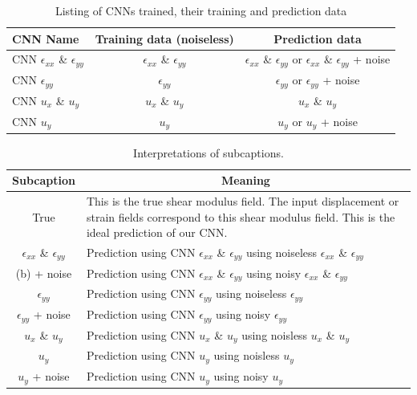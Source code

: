 \documentclass[12pt]{article}
\begin{document}
\begin{table}
  \centering
  \begin{tabular}{|l|c|c|}
    \hline
    CNN Name & Training data (noiseless) & Prediction data \\
    \hline
    CNN $\epsilon_{xx}$ \& $\epsilon_{yy}$ & $\epsilon_{xx}$ \& $\epsilon_{yy}$ & $\epsilon_{xx}$ \& $\epsilon_{yy}$ or $\epsilon_{xx}$ \& $\epsilon_{yy}$ + noise\\
    \hline
    CNN $\epsilon_{yy}$ & $\epsilon_{yy}$ & $\epsilon_{yy}$ or $\epsilon_{yy}$ + noise\\
    \hline
    CNN $u_x$ \& $u_y$ & $u_x$ \& $u_y$ & $u_x$ \& $u_y$\\
    \hline
    CNN $u_y$ & $u_y$ & $u_y$ or $u_y$ + noise\\
    \hline
  \end{tabular}
  \caption{\label{tab:cnnone:io} Listing of CNNs trained, their training and prediction data}
\end{table}
%
\begin{table}
  \centering
   \begin{tabular}{cp{8cm}}
    \hline
    \multicolumn{1}{|c|}{Subcaption} & \multicolumn{1}{c|}{Meaning}\\
    \hline
    \multicolumn{1}{|c|}{True} & \multicolumn{1}{p{8cm}|}{This is the true shear modulus field. The input displacement or strain fields correspond to this shear modulus field. This is the ideal prediction of our CNN.}\\
    \hline
    \multicolumn{1}{|c|}{$\epsilon_{xx}$ \& $\epsilon_{yy}$} & \multicolumn{1}{p{8cm}|}{Prediction using CNN $\epsilon_{xx}$ \& $\epsilon_{yy}$ using noiseless $\epsilon_{xx}$ \& $\epsilon_{yy}$}\\
    \hline
    \multicolumn{1}{|c|}{(b) + noise} & \multicolumn{1}{p{8cm}|}{Prediction using CNN $\epsilon_{xx}$ \& $\epsilon_{yy}$ using noisy $\epsilon_{xx}$ \& $\epsilon_{yy}$}\\
    \hline
    \multicolumn{1}{|c|}{$\epsilon_{yy}$} & \multicolumn{1}{p{8cm}|}{Prediction using CNN $\epsilon_{yy}$ using noiseless $\epsilon_{yy}$}\\
    \hline
    \multicolumn{1}{|c|}{$\epsilon_{yy}$ + noise} & \multicolumn{1}{p{8cm}|}{Prediction using CNN $\epsilon_{yy}$ using noisy $\epsilon_{yy}$}\\
    \hline
    \multicolumn{1}{|c|}{$u_x$ \& $u_y$} & \multicolumn{1}{p{8cm}|}{Prediction using CNN $u_x$ \& $u_y$  using noisless $u_x$ \& $u_y$ }\\
    \hline
    \multicolumn{1}{|c|}{$u_y$} & \multicolumn{1}{p{8cm}|}{Prediction using CNN $u_y$  using noisless $u_y$ }\\
    \hline
    \multicolumn{1}{|c|}{$u_y$ + noise} & \multicolumn{1}{p{8cm}|}{Prediction using CNN $u_y$  using noisy $u_y$ }\\
    \hline
  \end{tabular}
  \caption{\label{tab:subcap} Interpretations of subcaptions.}
\end{table}
\end{document}
